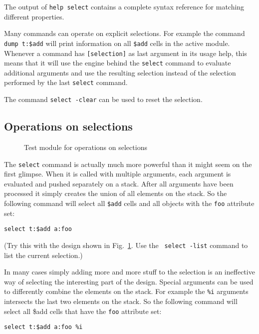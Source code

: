 \documentclass[9pt,technote,a4paper]{IEEEtran}
\begin{document}
The output of {\tt help select} contains a complete syntax reference for
matching different properties.

Many commands can operate on explicit selections. For example the command {\tt
dump t:\$add} will print information on all {\tt \$add} cells in the active
module. Whenever a command has {\tt [selection]} as last argument in its usage
help, this means that it will use the engine behind the {\tt select} command
to evaluate additional arguments and use the resulting selection instead of
the selection performed by the last {\tt select} command.

The command {\tt select -clear} can be used to reset the selection.

\subsection{Operations on selections}

\begin{figure}[b]

\caption{Test module for operations on selections}
\label{foobaraddsub}
\end{figure}

The {\tt select} command is actually much more powerful than it might seem on
the first glimpse. When it is called with multiple arguments, each argument is
evaluated and pushed separately on a stack. After all arguments have been
processed it simply creates the union of all elements on the stack. So the
following command will select all {\tt \$add} cells and all objects with
the {\tt foo} attribute set:

\begin{verbatim}
select t:$add a:foo
\end{verbatim}

(Try this with the design shown in Fig.~\ref{foobaraddsub}. Use the {\tt
select -list} command to list the current selection.)

In many cases simply adding more and more stuff to the selection is an
ineffective way of selecting the interesting part of the design. Special
arguments can be used to differently combine the elements on the stack.
For example the {\tt \%i} arguments intersects the last two elements on
the stack. So the following command will select all {\$add} cells that
have the {\tt foo} attribute set:

\begin{verbatim}
select t:$add a:foo %i
\end{verbatim}
\end{document}

